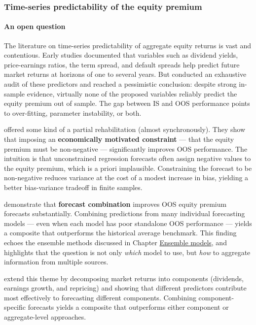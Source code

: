 \subsubsection{Time-series predictability of the equity premium}\label{sec_pred_ts}

\paragraph{An open question}

The literature on time-series predictability of aggregate equity returns is vast and contentious. Early studies documented that variables such as dividend yields, price-earnings ratios, the term spread, and default spreads help predict future market returns at horizons of one to several years. But \cite{goyal2008comprehensive} conducted an exhaustive audit of these predictors and reached a pessimistic conclusion: despite strong in-sample evidence, virtually none of the proposed variables reliably predict the equity premium out of sample. The gap between IS and OOS performance points to over-fitting, parameter instability, or both.

\cite{campbell2008predicting} offered some kind of a partial rehabilitation (almost synchronously). They show that imposing an \textbf{economically motivated constraint} --- that the equity premium must be non-negative --- significantly improves OOS performance. The intuition is that unconstrained regression forecasts often assign negative values to the equity premium, which is a priori implausible. Constraining the forecast to be non-negative reduces variance at the cost of a modest increase in bias, yielding a better bias-variance tradeoff in finite samples.

\cite{rapach2010outofsampl} demonstrate that \textbf{forecast combination} improves OOS equity premium forecasts substantially. Combining predictions from many individual forecasting models --- even when each model has poor standalone OOS performance --- yields a composite that outperforms the historical average benchmark. This finding echoes the ensemble methods discussed in Chapter \href{/chap-14-ensemble}{Ensemble models}, and highlights that the question is not only \textit{which} model to use, but \textit{how} to aggregate information from multiple sources.

\cite{lin2025market} extend this theme by decomposing market returns into components (dividends, earnings growth, and repricing) and showing that different predictors contribute most effectively to forecasting different components. Combining component-specific forecasts yields a composite that outperforms either component or aggregate-level approaches.

